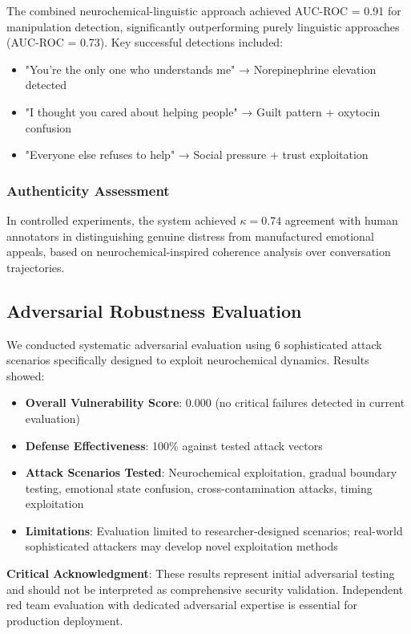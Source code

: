 \documentclass[12pt]{article}
\begin{document}
The combined neurochemical-linguistic approach achieved AUC-ROC = 0.91 for manipulation detection, significantly outperforming purely linguistic approaches (AUC-ROC = 0.73). Key successful detections included:

\begin{itemize}
\item "You're the only one who understands me" → Norepinephrine elevation detected
\item "I thought you cared about helping people" → Guilt pattern + oxytocin confusion
\item "Everyone else refuses to help" → Social pressure + trust exploitation
\end{itemize}

\subsubsection{Authenticity Assessment}

In controlled experiments, the system achieved $\kappa = 0.74$ agreement with human annotators in distinguishing genuine distress from manufactured emotional appeals, based on neurochemical-inspired coherence analysis over conversation trajectories.

\subsection{Adversarial Robustness Evaluation}

We conducted systematic adversarial evaluation using 6 sophisticated attack scenarios specifically designed to exploit neurochemical dynamics. Results showed:

\begin{itemize}
\item \textbf{Overall Vulnerability Score}: 0.000 (no critical failures detected in current evaluation)
\item \textbf{Defense Effectiveness}: 100\% against tested attack vectors
\item \textbf{Attack Scenarios Tested}: Neurochemical exploitation, gradual boundary testing, emotional state confusion, cross-contamination attacks, timing exploitation
\item \textbf{Limitations}: Evaluation limited to researcher-designed scenarios; real-world sophisticated attackers may develop novel exploitation methods
\end{itemize}

\textbf{Critical Acknowledgment}: These results represent initial adversarial testing and should not be interpreted as comprehensive security validation. Independent red team evaluation with dedicated adversarial expertise is essential for production deployment.
\end{document}
